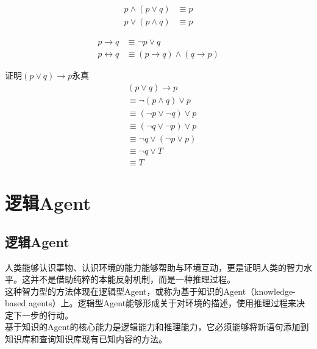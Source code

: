 \begin{tcolorbox}
    \begin{align}
        p \wedge (p \vee q) & \equiv p \\
        p \vee (p \wedge q) & \equiv p
    \end{align}
\end{tcolorbox}

\begin{tcolorbox}
    \begin{align}
        p \rightarrow q     & \equiv \neg p \vee q                              \\
        p \leftrightarrow q & \equiv (p \rightarrow q) \wedge (q \rightarrow p)
    \end{align}
\end{tcolorbox}

\begin{tcolorbox}
    证明$ (p \vee q) \rightarrow p $永真
    \begin{align*}
         & (p \vee q) \rightarrow p           \\
         & \equiv \neg (p \wedge q) \vee p    \\
         & \equiv (\neg p \vee \neg q) \vee p \\
         & \equiv (\neg q \vee \neg p) \vee p \\
         & \equiv \neg q \vee (\neg p \vee p) \\
         & \equiv \neg q \vee T               \\
         & \equiv T
    \end{align*}
\end{tcolorbox}

\newpage

\section{逻辑Agent}

\subsection{逻辑Agent}

人类能够认识事物、认识环境的能力能够帮助与环境互动，更是证明人类的智力水平。这并不是借助纯粹的本能反射机制，而是一种推理过程。\\

这种智力型的方法体现在逻辑型Agent，或称为基于知识的Agent（knowledge-based agents）上。逻辑型Agent能够形成关于对环境的描述，使用推理过程来决定下一步的行动。\\

基于知识的Agent的核心能力是逻辑能力和推理能力，它必须能够将新语句添加到知识库和查询知识库现有已知内容的方法。\\

\newpage
